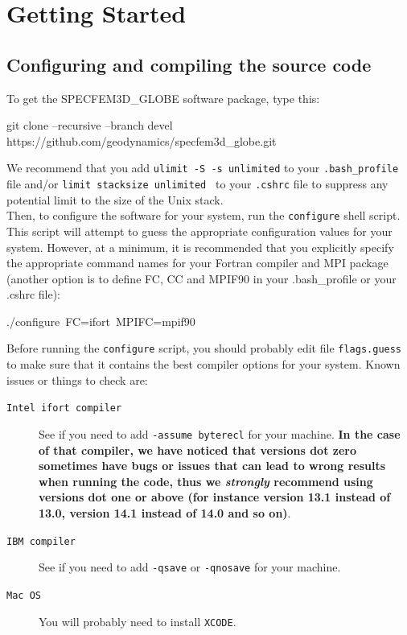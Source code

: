 \documentclass[oneside,english]{book}
\newenvironment{lyxcode}
{\begin{list}{}{
\setlength{\rightmargin}{\leftmargin}
\setlength{\listparindent}{0pt}%
\raggedright
\setlength{\itemsep}{0pt}
\setlength{\parsep}{0pt}
\normalfont\ttfamily}%
 \item[]}
{\end{list}}
\begin{document}
\chapter{\label{cha:Getting-Started}Getting Started}

\section{Configuring and compiling the source code}

To get the SPECFEM3D\_GLOBE software package, type this:

\begin{lyxcode}
git clone --recursive --branch devel https://github.com/geodynamics/specfem3d\_globe.git
\end{lyxcode}

We recommend that you add {\texttt{ulimit -S -s unlimited}} to your {\texttt{.bash\_profile}} file and/or {\texttt{limit stacksize unlimited }} to your {\texttt{.cshrc}} file to suppress any potential limit to the size of the Unix stack.\\

Then, to configure the software for your system, run the \texttt{configure}
shell script. This script will attempt to guess the appropriate configuration
values for your system. However, at a minimum, it is recommended that
you explicitly specify the appropriate command names for your Fortran
compiler and MPI package (another option is to define FC, CC and MPIF90 in your .bash\_profile
or your .cshrc file):

\begin{lyxcode}
./configure~FC=ifort~MPIFC=mpif90
\end{lyxcode}

Before running the \texttt{configure} script, you should probably edit file \texttt{flags.guess} to make sure that it contains the best compiler options for your system. Known issues or things to check are:

\begin{description}
\item [{\texttt{Intel ifort compiler}}] See if you need to add \texttt{-assume byterecl} for your machine. \textbf{In the case of that compiler, we have noticed that versions dot zero sometimes have bugs or issues that can lead to wrong results when running the code, thus we \emph{strongly} recommend using versions dot one or above (for instance version 13.1 instead of 13.0, version 14.1 instead of 14.0 and so on)}.
\item [{\texttt{IBM compiler}}] See if you need to add \texttt{-qsave} or \texttt{-qnosave} for your machine.
\item [{\texttt{Mac OS}}] You will probably need to install \texttt{XCODE}.
\end{description}
\end{document}
